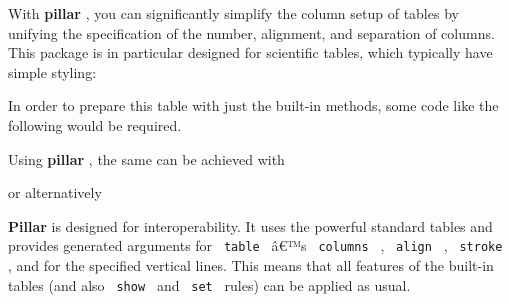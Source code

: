 With \textbf{pillar} , you can significantly simplify the column setup
of tables by unifying the specification of the number, alignment, and
separation of columns. This package is in particular designed for
scientific tables, which typically have simple styling:


In order to prepare this table with just the built-in methods, some code
like the following would be required.

\begin{Shaded}
\begin{Highlighting}[]


\NormalTok{)}
\end{Highlighting}
\end{Shaded}

Using \textbf{pillar} , the same can be achieved with

\begin{Shaded}
\begin{Highlighting}[]

\NormalTok{)}
\end{Highlighting}
\end{Shaded}

or alternatively

\begin{Shaded}
\begin{Highlighting}[]

\NormalTok{)}
\end{Highlighting}
\end{Shaded}

\textbf{Pillar} is designed for interoperability. It uses the powerful
standard tables and provides generated arguments for \texttt{\ table\ }
â€™s \texttt{\ columns\ } , \texttt{\ align\ } , \texttt{\ stroke\ } ,
and for the specified vertical lines. This means that all features of
the built-in tables (and also \texttt{\ show\ } and \texttt{\ set\ }
rules) can be applied as usual.

